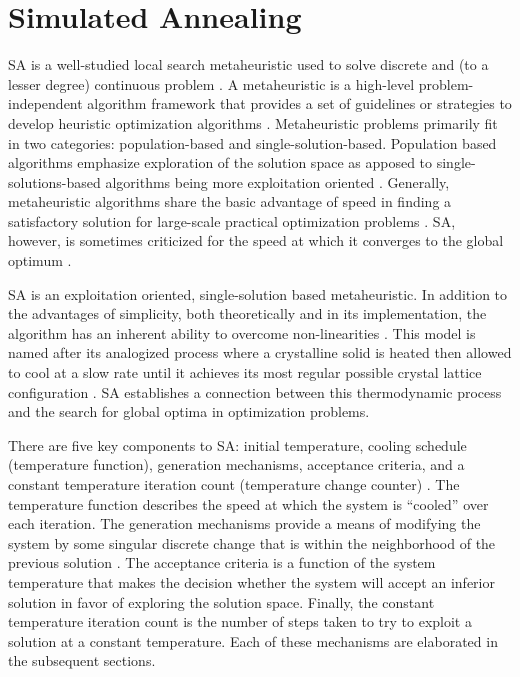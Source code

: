 \documentclass[11pt,a4paper,final]{article}
\begin{document}
\section{Simulated Annealing}
\label{sec:simulated-annealing}
SA is a well-studied local search metaheuristic used to solve discrete and (to a lesser degree) continuous problem
\cite{gendreau-2018-handb-metah,press-1992-numer-recip}. A metaheuristic is a high-level problem-independent algorithm
framework that provides a set of guidelines or strategies to develop heuristic optimization algorithms
\cite{radosavljevic-2018-metah-optim}. Metaheuristic problems primarily fit in two categories: population-based and
single-solution-based. Population based algorithms emphasize exploration of the solution space as apposed to
single-solutions-based algorithms being more exploitation oriented \cite{radosavljevic-2018-metah-optim}. Generally,
metaheuristic algorithms share the basic advantage of speed in finding a satisfactory solution for large-scale practical
optimization problems \cite{radosavljevic-2018-metah-optim}. SA, however, is sometimes criticized for the speed at
which it converges to the global optimum \cite{gendreau-2018-handb-metah,henderson-1989-theor-pract}.

SA is an exploitation oriented, single-solution based metaheuristic. In addition to the advantages of simplicity, both
theoretically and in its implementation, the algorithm has an inherent ability to overcome non-linearities
\cite{gendreau-2018-handb-metah,radosavljevic-2018-metah-optim}. This model is named after its analogized process
where a crystalline solid is heated then allowed to cool at a slow rate until it achieves its most regular possible
crystal lattice configuration \cite{henderson-1989-theor-pract,press-1992-numer-recip}. SA establishes a connection
between this thermodynamic process and the search for global optima in optimization problems.

There are five key components to SA: initial temperature, cooling schedule (temperature function), generation
mechanisms, acceptance criteria, and a constant temperature iteration count (temperature change counter)
\cite{keller-2019-multi-objec,press-1992-numer-recip}. The temperature function describes the speed at which the
system is ``cooled'' over each iteration. The generation mechanisms provide a means of modifying the system by some
singular discrete change that is within the neighborhood of the previous solution \cite{gendreau-2018-handb-metah}. The
acceptance criteria is a function of the system temperature that makes the decision whether the system will accept an
inferior solution in favor of exploring the solution space. Finally, the constant temperature iteration count is the
number of steps taken to try to exploit a solution at a constant temperature. Each of these mechanisms are elaborated in
the subsequent sections.
\end{document}
